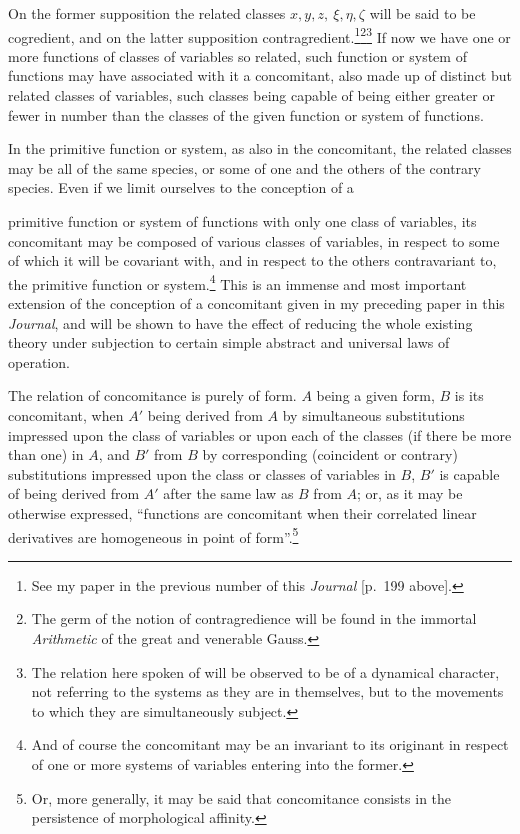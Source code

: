 \documentclass[11pt]{article}
\newcommand{\sourcepage}[1]{\marginpar{\scriptsize p.~#1}}
\begin{document}
{{On the former supposition the related classes $x,y,z,\ \xi,\eta,\zeta$ will be said to be cogredient, and on the latter supposition contragredient.\footnote{See my paper in the previous number of this \emph{Journal} [p.~199 above].}\footnote{The germ of the notion of contragredience will be found in the immortal \emph{Arithmetic} of the great and venerable Gauss.}\footnote{The relation here spoken of will be observed to be of a dynamical character, not referring to the systems as they are in themselves, but to the movements to which they are simultaneously subject.} If now we have one or more functions of classes of variables so related, such function or system of functions may have associated with it a concomitant, also made up of distinct but related classes of variables, such classes being capable of being either greater or fewer in number than the classes of the given function or system of functions.

In the primitive function or system, as also in the concomitant, the related classes may be all of the same species, or some of one and the others of the contrary species. Even if we limit ourselves to the conception of a

\sourcepage{286}
primitive function or system of functions with only one class of variables, its concomitant may be composed of various classes of variables, in respect to some of which it will be covariant with, and in respect to the others contravariant to, the primitive function or system.\footnote{And of course the concomitant may be an invariant to its originant in respect of one or more systems of variables entering into the former.} This is an immense and most important extension of the conception of a concomitant given in my preceding paper in this \emph{Journal}, and will be shown to have the effect of reducing the whole existing theory under subjection to certain simple abstract and universal laws of operation.

The relation of concomitance is purely of form. $A$ being a given form, $B$ is its concomitant, when $A'$ being derived from $A$ by simultaneous substitutions impressed upon the class of variables or upon each of the classes (if there be more than one) in $A$, and $B'$ from $B$ by corresponding (coincident or contrary) substitutions impressed upon the class or classes of variables in $B$, $B'$ is capable of being derived from $A'$ after the same law as $B$ from $A$; or, as it may be otherwise expressed, ``functions are concomitant when their correlated linear derivatives are homogeneous in point of form''.\footnote{Or, more generally, it may be said that concomitance consists in the persistence of morphological affinity.}

}}
\end{document}
